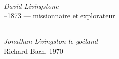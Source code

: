 \noindent\begin{minipage}[t][\textheight][s]{\textwidth}
\vfill
\begin{center}

  \begin{minipage}[t]{0.8\textwidth}
    \centering
    \\[0.3em]
    {\figcaptionname\itshape David Livingstone}\\
    {--1873 — missionnaire et explorateur}
  \end{minipage}

\end{center}
\vfill
\begin{center}

  \begin{minipage}[t]{0.8\textwidth}
    \centering
    \\[0.3em]
    {\figcaptionname\itshape Jonathan Livingston le goéland}\\
    {\figcaptiondetail Richard Bach, 1970}
  \end{minipage}

\end{center}
\vfill
\end{minipage}
